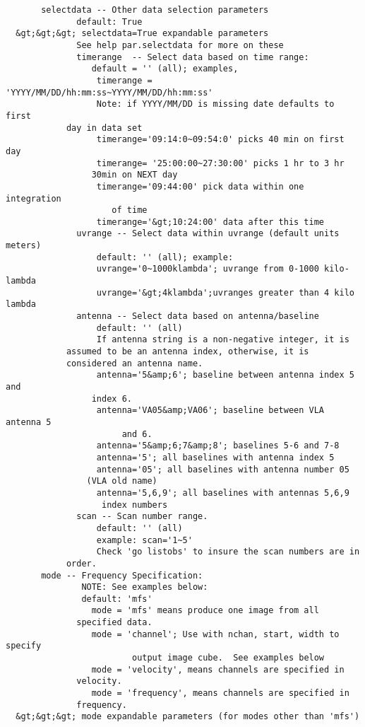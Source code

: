 \begin{verbatim}
       selectdata -- Other data selection parameters
              default: True
  &gt;&gt;&gt; selectdata=True expandable parameters
              See help par.selectdata for more on these
              timerange  -- Select data based on time range:
                 default = '' (all); examples,
                  timerange = 'YYYY/MM/DD/hh:mm:ss~YYYY/MM/DD/hh:mm:ss'
                  Note: if YYYY/MM/DD is missing date defaults to first 
			day in data set
                  timerange='09:14:0~09:54:0' picks 40 min on first day
                  timerange= '25:00:00~27:30:00' picks 1 hr to 3 hr 
			     30min on NEXT day
                  timerange='09:44:00' pick data within one integration 
		             of time
                  timerange='&gt;10:24:00' data after this time
              uvrange -- Select data within uvrange (default units meters)
                  default: '' (all); example:
                  uvrange='0~1000klambda'; uvrange from 0-1000 kilo-lambda
                  uvrange='&gt;4klambda';uvranges greater than 4 kilo lambda
              antenna -- Select data based on antenna/baseline
                  default: '' (all)
                  If antenna string is a non-negative integer, it is 
 		    assumed to be an antenna index, otherwise, it is
 		    considered an antenna name.
                  antenna='5&amp;6'; baseline between antenna index 5 and 
 				 index 6.
                  antenna='VA05&amp;VA06'; baseline between VLA antenna 5 
 				       and 6.
                  antenna='5&amp;6;7&amp;8'; baselines 5-6 and 7-8
                  antenna='5'; all baselines with antenna index 5
                  antenna='05'; all baselines with antenna number 05 
 				(VLA old name)
                  antenna='5,6,9'; all baselines with antennas 5,6,9 
 				   index numbers
              scan -- Scan number range.
                  default: '' (all)
                  example: scan='1~5'
                  Check 'go listobs' to insure the scan numbers are in 
 			order.
       mode -- Frequency Specification:
               NOTE: See examples below:
               default: 'mfs'
                 mode = 'mfs' means produce one image from all 
 		      specified data.
                 mode = 'channel'; Use with nchan, start, width to specify
                         output image cube.  See examples below
                 mode = 'velocity', means channels are specified in 
 		      velocity.
                 mode = 'frequency', means channels are specified in 
 		      frequency.
  &gt;&gt;&gt; mode expandable parameters (for modes other than 'mfs')

\end{verbatim}
